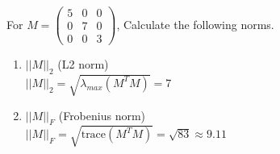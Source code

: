\documentclass[a4paper]{article}
\theoremstyle{definition}
\newenvironment{soln}{
	\leavevmode\color{blue}\ignorespaces
}{}
\begin{document}
	For $M = \begin{pmatrix}
		5 & 0 & 0 \\ 0 & 7 & 0 \\ 0 & 0 & 3
		
	\end{pmatrix}$, Calculate the following norms.
	\begin{enumerate}\addtocounter{enumi}{3}
		\item $||M||_{2}$ (L2 norm) \\
		\begin{soln} $||M||_{2} = \sqrt{\lambda_{max}(M^T M)}= 7$ \end{soln}
		
		\item $||M||_{F}$ (Frobenius norm)\\
		\begin{soln} $||M||_{F} = \sqrt{\text{trace}(M^T M)} = \sqrt{83} \approx 9.11$ \end{soln}
		
		
	\end{enumerate}
	
	
\end{document}
